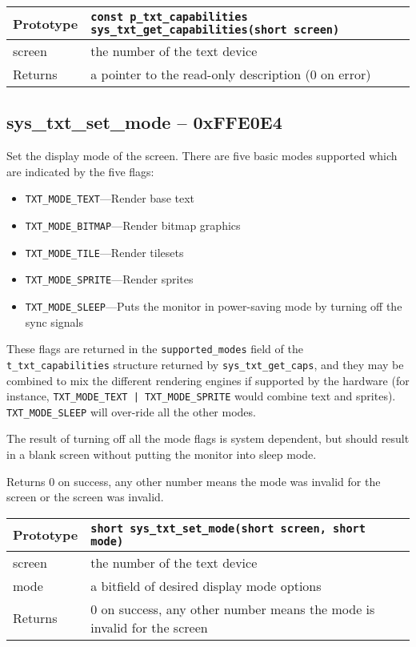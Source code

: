 \bigskip

\begin{tabular}{|l||l|} \hline
Prototype & \lstinline!const p_txt_capabilities sys_txt_get_capabilities(short screen)! \\ \hline
screen & the number of the text device \\ \hline
Returns & a pointer to the read-only description (0 on error) \\ \hline
\end{tabular}

\subsection*{sys\_txt\_set\_mode -- 0xFFE0E4}
Set the display mode of the screen. There are five basic modes supported which are indicated by the five flags:
\begin{itemize}
    \item \verb+TXT_MODE_TEXT+---Render base text
    \item \verb+TXT_MODE_BITMAP+---Render bitmap graphics
    \item \verb+TXT_MODE_TILE+---Render tilesets
    \item \verb+TXT_MODE_SPRITE+---Render sprites
    \item \verb+TXT_MODE_SLEEP+---Puts the monitor in power-saving mode by turning off the sync signals
\end{itemize}

These flags are returned in the \verb+supported_modes+ field of the \verb+t_txt_capabilities+ structure returned by \verb+sys_txt_get_caps+, and they may be combined to mix the different rendering engines if supported by the hardware (for instance, \verb+TXT_MODE_TEXT | TXT_MODE_SPRITE+ would combine text and sprites). \verb+TXT_MODE_SLEEP+ will over-ride all the other modes.

The result of turning off all the mode flags is system dependent, but should result in a blank screen without putting the monitor into sleep mode.

Returns 0 on success, any other number means the mode was invalid for the screen or the screen was invalid.

\bigskip

\begin{tabular}{|l||l|} \hline
Prototype & \lstinline!short sys_txt_set_mode(short screen, short mode)! \\ \hline
screen & the number of the text device \\ \hline
mode & a bitfield of desired display mode options \\ \hline
Returns & 0 on success, any other number means the mode is invalid for the screen \\ \hline
\end{tabular}

